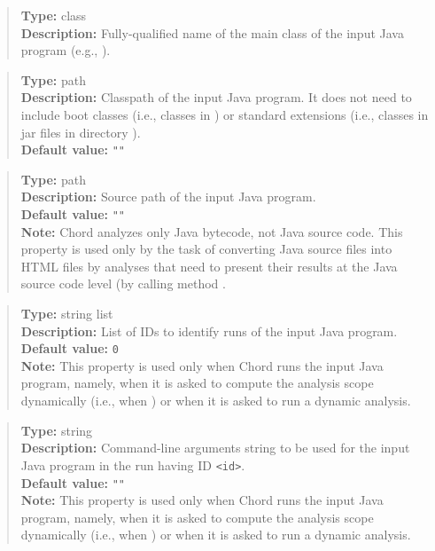\begin{quote}
{\bf Type:} class \\
{\bf Description:} Fully-qualified name of the main class of the input Java program (e.g., ).
\end{quote}

\begin{quote}
{\bf Type:} path \\
{\bf Description:} Classpath of the input Java program.  It does not need to include
boot classes (i.e., classes in ) or
standard extensions (i.e., classes in jar files in directory ). \\
{\bf Default value:} {\tt ""}
\end{quote}

\begin{quote}
{\bf Type:} path \\
{\bf Description:} Source path of the input Java program. \\
{\bf Default value:} {\tt ""} \\
{\bf Note:} Chord analyzes only Java bytecode, not Java source code.  This property is used only by the task of converting Java source files into HTML files by analyses that need to present their results at the Java source code level (by calling method .
\end{quote}

\begin{quote}
{\bf Type:} string list \\
{\bf Description:} List of IDs to identify runs of the input Java program. \\
{\bf Default value:} {\tt 0} \\
{\bf Note:} This property is used only when Chord runs the input Java program, namely, when it is asked to compute the analysis scope dynamically (i.e., when ) or when it is asked to run a dynamic analysis. 
\end{quote}

\begin{quote}
{\bf Type:} string \\
{\bf Description:} Command-line arguments string to be used for the input Java program in the run having ID {\tt <id>}. \\
{\bf Default value:} {\tt ""} \\
{\bf Note:} This property is used only when Chord runs the input Java program, namely, when it is asked to compute the analysis scope dynamically (i.e., when ) or when it is asked to run a dynamic analysis.
\end{quote}

